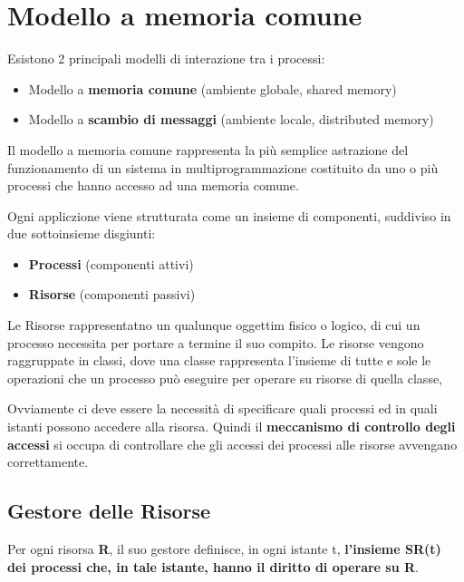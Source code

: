 \documentclass{article}
\begin{document}
\newpage

\section{Modello a memoria comune}

Esistono 2 principali modelli di interazione tra i processi:
\begin{itemize}
    \item Modello a \textbf{memoria comune} (ambiente globale, shared memory)
    \item Modello a \textbf{scambio di messaggi} (ambiente locale, distributed memory)
\end{itemize}

Il modello a memoria comune rappresenta la più semplice astrazione del funzionamento di un sistema in multiprogrammazione costituito da uno o più processi che hanno accesso
ad una memoria comune.

Ogni appliczione viene strutturata come un insieme di componenti, suddiviso in due sottoinsieme disgiunti:
\begin{itemize}
    \item \textbf{Processi} (componenti attivi)
    \item \textbf{Risorse} (componenti passivi)
\end{itemize}

Le Risorse rappresentatno un qualunque oggettim fisico o logico, di cui un processo necessita per portare a termine il suo compito.
Le risorse vengono raggruppate in classi, dove una classe rappresenta l'insieme di tutte e sole le operazioni che un processo può eseguire per operare su risorse di quella classe,

Ovviamente ci deve essere la necessità di specificare quali processi ed in quali istanti possono accedere alla risorsa. Quindi il \textbf{meccanismo di controllo degli accessi}
si occupa di controllare che gli accessi dei processi alle risorse avvengano correttamente.

\subsection{Gestore delle Risorse}

Per ogni risorsa \textbf{R}, il suo gestore definisce, in ogni istante t, \textbf{l'insieme SR(t) dei processi che, in tale istante, hanno il diritto di operare su R}.

\vspace{5mm}
\end{document}
